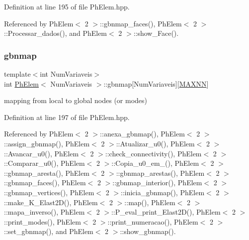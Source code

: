 Definition at line 195 of file Ph\+Elem.\+hpp.



Referenced by Ph\+Elem$<$ 2 $>$\+::gbnmap\+\_\+faces(), Ph\+Elem$<$ 2 $>$\+::\+Processar\+\_\+dados(), and Ph\+Elem$<$ 2 $>$\+::show\+\_\+\+Face().

\mbox{\label{classPhElem_ab27e9040a72ec923a90cffb25f5b0c15}} 
\subsubsection{\texorpdfstring{gbnmap}{gbnmap}}
{\footnotesize\ttfamily template$<$int Num\+Variaveis$>$ \\
int \hyperlink{classPhElem}{Ph\+Elem}$<$ Num\+Variaveis $>$\+::gbnmap\mbox{[}Num\+Variaveis\mbox{]}\mbox{[}\hyperlink{MyOptions_8h_a2f91e7a0b4bf68a62a0f3d38904dea2c}{M\+A\+X\+NN}\mbox{]}\hspace{0.3cm}{\ttfamily [protected]}}



mapping from local to global nodes (or modes) 



Definition at line 197 of file Ph\+Elem.\+hpp.



Referenced by Ph\+Elem$<$ 2 $>$\+::anexa\+\_\+gbnmap(), Ph\+Elem$<$ 2 $>$\+::assign\+\_\+gbnmap(), Ph\+Elem$<$ 2 $>$\+::\+Atualizar\+\_\+u0(), Ph\+Elem$<$ 2 $>$\+::\+Avancar\+\_\+u0(), Ph\+Elem$<$ 2 $>$\+::check\+\_\+connectivity(), Ph\+Elem$<$ 2 $>$\+::\+Comparar\+\_\+u0(), Ph\+Elem$<$ 2 $>$\+::\+Copia\+\_\+u0\+\_\+em\+\_\+(), Ph\+Elem$<$ 2 $>$\+::gbnmap\+\_\+aresta(), Ph\+Elem$<$ 2 $>$\+::gbnmap\+\_\+arestas(), Ph\+Elem$<$ 2 $>$\+::gbnmap\+\_\+faces(), Ph\+Elem$<$ 2 $>$\+::gbnmap\+\_\+interior(), Ph\+Elem$<$ 2 $>$\+::gbnmap\+\_\+vertices(), Ph\+Elem$<$ 2 $>$\+::inicia\+\_\+gbnmap(), Ph\+Elem$<$ 2 $>$\+::make\+\_\+\+K\+\_\+\+Elast2\+D(), Ph\+Elem$<$ 2 $>$\+::map(), Ph\+Elem$<$ 2 $>$\+::mapa\+\_\+inverso(), Ph\+Elem$<$ 2 $>$\+::\+P\+\_\+eval\+\_\+print\+\_\+\+Elast2\+D(), Ph\+Elem$<$ 2 $>$\+::print\+\_\+modes(), Ph\+Elem$<$ 2 $>$\+::print\+\_\+numeracao(), Ph\+Elem$<$ 2 $>$\+::set\+\_\+gbnmap(), and Ph\+Elem$<$ 2 $>$\+::show\+\_\+gbnmap().

\mbox{\label{classPhElem_a8188f64662092eb065a85d49f3ae6649}} 
